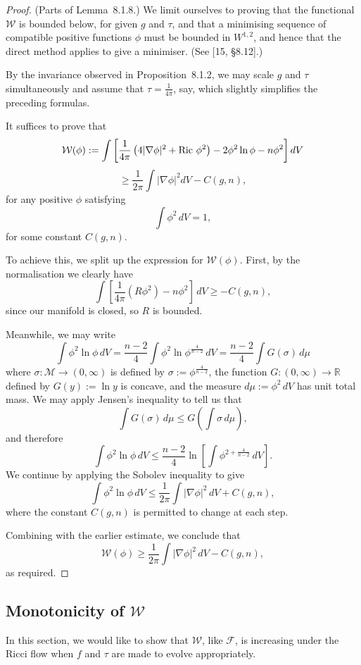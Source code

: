 \begin{proof}
(Parts of Lemma~8.1.8.) We limit ourselves to proving that the functional
$\mathcal W$ is bounded below, for given $g$ and $\tau$, and that a minimising
sequence of compatible positive functions $\phi$ must be bounded in $W^{1,2}$,
and hence that the direct method applies to give a minimiser. (See [15, \S8.12].)

By the invariance observed in Proposition~8.1.2, we may scale $g$ and $\tau$
simultaneously and assume that $\tau = \frac{1}{4\pi}$, say, which slightly
simplifies the preceding formulas.

It suffices to prove that
\[
\mathcal W(\phi) := \int \left[ \frac{1}{4\pi}\left(4|\nabla \phi|^2 + \operatorname{Ric}\, \phi^2\right) - 2\phi^2 \ln \phi - n\phi^2 \right] dV
\]
\[
\geq \frac{1}{2\pi} \int |\nabla \phi|^2 dV - C(g,n),
\]
for any positive $\phi$ satisfying
\[
\int \phi^2\,dV = 1,
\]
for some constant $C(g,n)$.

To achieve this, we split up the expression for $\mathcal W(\phi)$. First, by
the normalisation we clearly have
\[
\int \left[\frac{1}{4\pi}(R\phi^2)-n\phi^2\right]\,dV \ge -C(g,n),
\]
since our manifold is closed, so $R$ is bounded.

Meanwhile, we may write
\[
\int \phi^2 \ln \phi\,dV
= \frac{n-2}{4}\int \phi^2 \ln \phi^{\frac{4}{n-2}}\,dV
= \frac{n-2}{4}\int G(\sigma)\,d\mu
\]
where $\sigma:\mathcal M\to (0,\infty)$ is defined by $\sigma := \phi^{\frac{4}{n-2}}$, the function $G:(0,\infty)\to \mathbb R$ defined by $G(y):=\ln y$ is concave, and the measure $d\mu := \phi^2\,dV$ has unit total mass. We may apply Jensen's inequality to tell us that
\[
\int G(\sigma)\,d\mu \le G\left(\int \sigma\,d\mu\right),
\]
and therefore
\[
\int \phi^2 \ln \phi\,dV
\le \frac{n-2}{4}\ln\left[\int \phi^{2+\frac{4}{n-2}}\,dV\right].
\]
We continue by applying the Sobolev inequality to give
\[
\int \phi^2 \ln \phi\,dV \le \frac{1}{2\pi}\int |\nabla\phi|^2\,dV + C(g,n),
\]
where the constant $C(g,n)$ is permitted to change at each step.

Combining with the earlier estimate, we conclude that
\[
\mathcal W(\phi) \ge \frac{1}{2\pi}\int |\nabla\phi|^2\,dV - C(g,n),
\]
as required.
\end{proof}

\subsection{Monotonicity of $\mathcal W$}

In this section, we would like to show that $\mathcal W$, like
$\mathcal F$, is increasing under the Ricci flow when $f$ and $\tau$ are made
to evolve appropriately.

